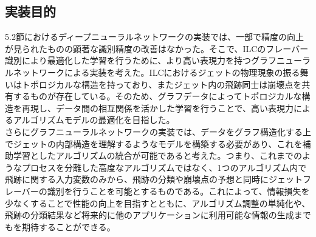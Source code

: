 \subsection{実装目的}
5.2節におけるディープニューラルネットワークの実装では、一部で精度の向上が見られたものの顕著な識別精度の改善はなかった。そこで、ILCのフレーバー識別により最適化した学習を行うために、より高い表現力を持つグラフニューラルネットワークによる実装を考えた。ILCにおけるジェットの物理現象の振る舞いはトポロジカルな構造を持っており、またジェット内の飛跡同士は崩壊点を共有するものが存在している。そのため、グラフデータによってトポロジカルな構造を再現し、データ間の相互関係を活かした学習を行うことで、高い表現力によるアルゴリズムモデルの最適化を目指した。\\
さらにグラフニューラルネットワークの実装では、データをグラフ構造化する上でジェットの内部構造を理解するようなモデルを構築する必要があり、これを補助学習としたアルゴリズムの統合が可能であると考えた。つまり、これまでのようなプロセスを分離した高度なアルゴリズムではなく、1つのアルゴリズム内で飛跡に関する入力変数のみから、飛跡の分類や崩壊点の予想と同時にジェットフレーバーの識別を行うことを可能とするものである。これによって、情報損失を少なくすることで性能の向上を目指すとともに、アルゴリズム調整の単純化や、飛跡の分類結果など将来的に他のアプリケーションに利用可能な情報の生成までもを期待することができる。
